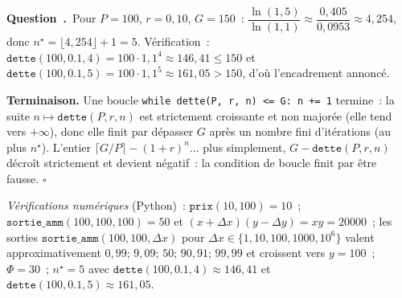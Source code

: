 \documentclass[11pt,a4paper]{article}
\newcounter{qcnt}
\newcommand{\Q}{\medskip\par\stepcounter{qcnt}\noindent\textbf{Question~\theqcnt.}~}
\newcommand{\code}[1]{\lstinline!#1!}
\begin{document}
\Q Pour $P=100$, $r=0{,}10$, $G=150$~: $\dfrac{\ln(1{,}5)}{\ln(1{,}1)} \approx
\dfrac{0{,}405}{0{,}0953} \approx 4{,}254$, donc $n^{\star} = \lfloor 4{,}254\rfloor + 1 = 5$.
Vérification~: $\mathtt{dette}(100,0.1,4) = 100\cdot1{,}1^4 \approx 146{,}41 \le 150$ et
$\mathtt{dette}(100,0.1,5) = 100\cdot1{,}1^5 \approx 161{,}05 > 150$, d'où l'encadrement annoncé.

\noindent\textbf{Terminaison.} Une boucle \code{while dette(P, r, n) <= G: n += 1} termine~: la
suite $n \mapsto \mathtt{dette}(P,r,n)$ est strictement croissante et non majorée (elle tend vers
$+\infty$), donc elle finit par dépasser $G$ après un nombre fini d'itérations (au plus
$n^{\star}$). L'entier $\lceil G/P\rceil - (1+r)^n$... plus simplement, $G - \mathtt{dette}(P,r,n)$
décroît strictement et devient négatif~: la condition de boucle finit par être fausse. $\square$

\medskip
\noindent\emph{Vérifications numériques} (Python)~: $\mathtt{prix}(10,100)=10$~;
$\mathtt{sortie\_amm}(100,100,100)=50$ et $(x+\Delta x)(y-\Delta y)=xy=20000$~; les sorties
$\mathtt{sortie\_amm}(100,100,\Delta x)$ pour $\Delta x \in \{1,10,100,1000,10^6\}$ valent
approximativement $0{,}99;\,9{,}09;\,50;\,90{,}91;\,99{,}99$ et croissent vers $y=100$~;
$\Phi = 30$~; $n^{\star}=5$ avec $\mathtt{dette}(100,0.1,4)\approx146{,}41$ et
$\mathtt{dette}(100,0.1,5)\approx161{,}05$.
\end{document}
